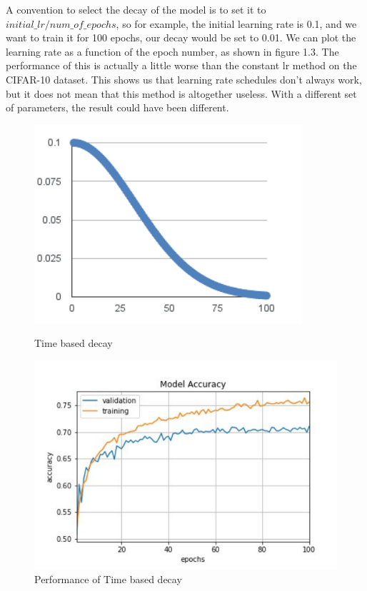 A convention to select the decay of the model is to set it to \(initial\_lr/num\_of\_epochs\), so for example, the initial learning rate is 0.1, and we want to train it for 100 epochs, our decay would be set to 0.01. We can plot the learning rate as a function of the epoch number, as shown in figure 1.3. The performance of this is actually a little worse than the constant lr method on the CIFAR-10 dataset. This shows us that learning rate schedules don't always work, but it does not mean that this method is altogether useless. With a different set of parameters, the result could have been different.
\begin{figure}[!ht]
  \centering
  \begin{minipage}[b]{0.4\textwidth}
    \includegraphics[width=\textwidth]{./imgs/2019A7PS0097P-03.png}
    \caption{Time based decay}
    \label{fig:time_based_decay}
  \end{minipage}
  \hfill
  \begin{minipage}[b]{0.4\textwidth}
    \includegraphics[width=\textwidth]{./imgs/2019A7PS0097P-04.png}
    \caption{Performance of Time based decay}
  \end{minipage}
\end{figure}


